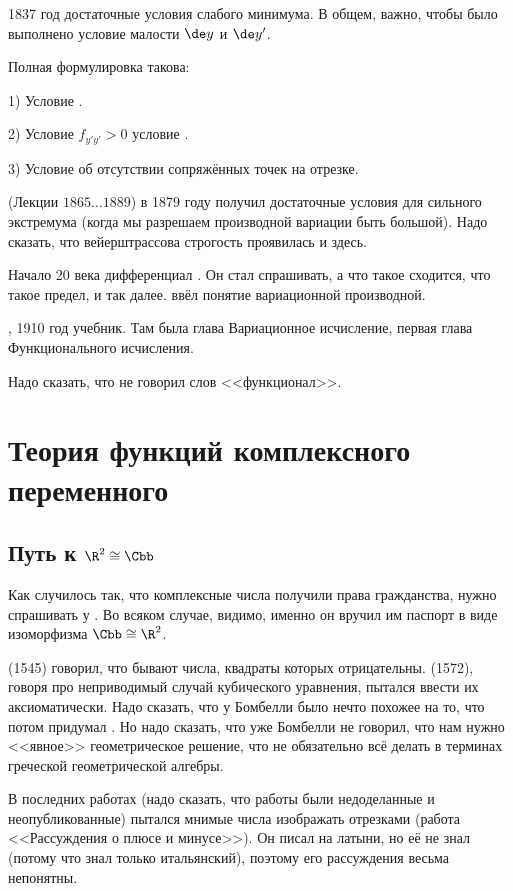 \documentclass[a4paper,oneside,fleqn,10pt]{article}
\newcommand{\pe}[2]{${#1}\ldots{#2}$}
\begin{document}
1837 год достаточные условия слабого минимума. В общем, важно, чтобы было выполнено
условие малости $\de y$  и $\de y'$.

Полная формулировка такова:

1) Условие .

2) Условие $f_{y'y'} > 0$ условие .

3) Условие  об отсутствии сопряжённых точек на отрезке.

 (Лекции \pe{1865}{1889}) в 1879 году получил достаточные условия
для сильного экстремума (когда мы разрешаем производной вариации быть большой).
Надо сказать, что вейерштрассова строгость проявилась и здесь.

Начало 20 века дифференциал . Он стал спрашивать, а что такое сходится,
что такое предел, и так далее.  ввёл понятие вариационной производной.

, 1910 год учебник. Там была глава Вариационное исчисление, первая глава Функционального исчисления.

Надо сказать, что  не говорил слов <<функционал>>.


\section{Теория функций комплексного переменного}

\subsection{Путь к $\R^2 \cong \Cbb$}

Как случилось так, что комплексные числа получили права гражданства,
нужно спрашивать у . Во всяком случае, видимо, именно он вручил
им паспорт в виде изоморфизма $\Cbb \cong \R^2$.

 (1545) говорил, что бывают числа, квадраты которых отрицательны.
 (1572), говоря про неприводимый случай кубического уравнения, пытался
ввести их аксиоматически. Надо сказать, что у Бомбелли было нечто похожее
на то, что потом придумал . Но надо сказать, что уже Бомбелли не говорил,
что нам нужно <<явное>> геометрическое решение, что не обязательно всё делать
в терминах греческой геометрической алгебры.

В последних работах  (надо сказать, что работы были недоделанные и неопубликованные)
пытался мнимые числа изображать отрезками (работа <<Рассуждения о плюсе и минусе>>).
Он писал на латыни, но её не знал
(потому что знал только итальянский), поэтому его рассуждения весьма непонятны.
\end{document}
